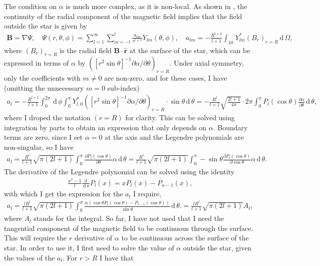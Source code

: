 \documentclass[letterpaper,10pt]{article}
\newcommand{\dd}{\,\mathrm{d}\,}
\newcommand{\pp}{\partial}
\renewcommand{\vec}[1]{\boldsymbol#1}
\newcommand{\bhat}[1]{\hat{\boldsymbol#1}}
\begin{document}
The condition on $\alpha$ is much more complex, as it is non-local. As shown in \citet{mar+11}, the continuity of the radial component of the magnetic field implies that the field outside the star is given by
\begin{eqnarray}
\vec{B}=\nabla\Psi,\quad \Psi(r,\theta,\phi)=\sum_{l=1}^{\infty}\sum_{m=-l}^{l}\frac{a_{lm}}{r^{l+1}}Y_{lm}(\theta,\phi),\quad a_{lm}=-\frac{R^{l+2}}{l+1}\int_{4\pi}Y_{lm}^*(B_r)_{r=R}\dd\Omega,
\end{eqnarray}
where $(B_r)_{r=R}$ is the radial field $\vec{B}\cdot\bhat{r}$ at the surface of the star, which can be expressed in terms of $\alpha$ by $([r^2\sin\theta]^{-1}\pp\alpha/\pp\theta)_{r=R}$. Under axial symmetry, only the coefficients with $m\neq0$ are non-zero, and for these cases, I have (omitting the unnecessary $m=0$ sub-index)
\begin{eqnarray}
a_l=-\frac{R^{l+2}}{l+1}\int_0^{2\pi}\dd\phi\int_0^{\pi} Y_{l,0}^*([r^2\sin\theta]^{-1}\pp\alpha/\pp\theta)_{r=R}\cdot \sin\theta\dd\theta=-\frac{R^l}{l+1}\sqrt{\frac{2l+1}{4\pi}}\cdot 2\pi \int_0^{\pi} P_l(\cos\theta)\frac{\pp\alpha}{\pp\theta} \dd\theta,
\end{eqnarray}
where I droped the notation $(r=R)$ for clarity. This can be solved using integration by parts to obtain an expression that only depends on $\alpha$. Boundary terms are zero, since I set $\alpha=0$ at the axis and the Legendre polynomials are non-singular, so I have
\begin{eqnarray}
a_l=\frac{R^l}{l+1}\sqrt{\pi(2l+1)}\int_0^{\pi}\frac{\pp P_l(\cos\theta)}{\pp \theta}\alpha\dd\theta=\frac{R^l}{l+1}\sqrt{\pi(2l+1)}\int_0^{\pi}-\sin\theta\frac{\pp P_l(\cos\theta)}{\pp \cos\theta}\alpha\dd\theta.
\end{eqnarray}
The derivative of the Legendre polynomial can be solved using the identity
\begin{eqnarray}
\frac{x^2-1}{l}\frac{\dd}{\dd x}P_l(x)=xP_l(x)-P_{n-1}(x),\label{identityLeg}
\end{eqnarray}
with which I get the expression for the $a_l$ I require,
\begin{eqnarray}
a_l=\frac{lR^l}{l+1}\sqrt{\pi(2l+1)}\int_0^{\pi}\frac{\alpha(\cos\theta P_l(\cos\theta)-P_{l-1}(\cos\theta))}{\sin\theta}\dd\theta.=\frac{lR^l}{l+1}\sqrt{\pi(2l+1)}A_l,
\end{eqnarray}
where $A_l$ stands for the integral. So far, I have not used that I need the tangential component of the magnetic field to be continuous through the surface. This will require the $r$ derivative of $\alpha$ to be continuous across the surface of the star. In order to use it, I first need to solve the value of $\alpha$ outside the star, given the values of the $a_l$. For $r>R$ I have that
\end{document}
